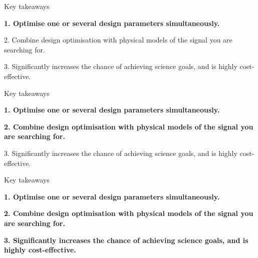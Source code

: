 \documentclass[aspectratio=169]{beamer}
\newcommand{\greyed}[1]{\textcolor{gray!60}{#1}}
\begin{document}
\begin{frame}{\small{Key takeaways}}
\begin{tcolorbox}[resultbox]
\normalsize
\textbf{1. Optimise one or several design parameters simultaneously.}
\end{tcolorbox}

\vspace{0.30cm}
\normalsize
\greyed{2. Combine design optimisation with physical models of the signal you are searching for.}

\vspace{0.24cm}
\greyed{3. Significantly increases the chance of achieving science goals, and is highly cost-effective.}
\end{frame}

\begin{frame}{\small{Key takeaways}}
\begin{tcolorbox}[resultbox]
\normalsize
\textbf{1. Optimise one or several design parameters simultaneously.}
\end{tcolorbox}

\vspace{0.20cm}
\begin{tcolorbox}[resultbox]
\normalsize
\textbf{2. Combine design optimisation with physical models of the signal you are searching for.}
\end{tcolorbox}

\vspace{0.20cm}
\normalsize
\greyed{3. Significantly increases the chance of achieving science goals, and is highly cost-effective.}
\end{frame}

\begin{frame}{\small{Key takeaways}}
\begin{tcolorbox}[resultbox]
\normalsize
\textbf{1. Optimise one or several design parameters simultaneously.}
\end{tcolorbox}

\vspace{0.05cm}
\begin{tcolorbox}[resultbox]
\normalsize
\textbf{2. Combine design optimisation with physical models of the signal you are searching for.}
\end{tcolorbox}

\vspace{0.04cm}
\begin{tcolorbox}[resultbox]
\normalsize
\textbf{3. Significantly increases the chance of achieving science goals, and is highly cost-effective.}
\end{tcolorbox}
\end{frame}
\end{document}
